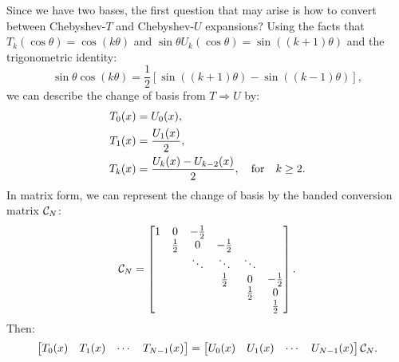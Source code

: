 Since we have two bases, the first question that may arise is how to convert between Chebyshev-$T$ and Chebyshev-$U$ expansions? Using the facts that $T_k(\cos\theta) = \cos(k\theta)$ and $\sin\theta U_k(\cos\theta) = \sin((k+1)\theta)$ and the trigonometric identity:
\begin{equation}
\sin\theta\cos(k\theta) = \dfrac{1}{2}\left[\sin((k+1)\theta) - \sin((k-1)\theta)\right],
\end{equation}
we can describe the change of basis from $T\Rightarrow U$ by:
\begin{align}
T_0(x) & = U_0(x),\\
T_1(x) & = \dfrac{U_1(x)}{2},\\
T_k(x) & = \dfrac{U_k(x) - U_{k-2}(x)}{2},\quad{\rm for}\quad k\ge2.
\end{align}
In matrix form, we can represent the change of basis by the banded conversion matrix $\mathcal{C}_N$:
\begin{equation}
\mathcal{C}_N = \begin{bmatrix}
1 & 0 & -\tfrac{1}{2}\\
& \tfrac{1}{2} & 0 & -\tfrac{1}{2}\\
& & \ddots & \ddots & \ddots\\
& & & \tfrac{1}{2} & 0 & -\tfrac{1}{2}\\
& & & & \tfrac{1}{2} & 0\\
& & & & & \tfrac{1}{2}\\
\end{bmatrix}.
\end{equation}
Then:
\begin{equation}
\begin{bmatrix} T_0(x) & T_1(x) & \cdots & T_{N-1}(x)\\\end{bmatrix} = \begin{bmatrix} U_0(x) & U_1(x) & \cdots & U_{N-1}(x)\\\end{bmatrix}\mathcal{C}_N.
\end{equation}

